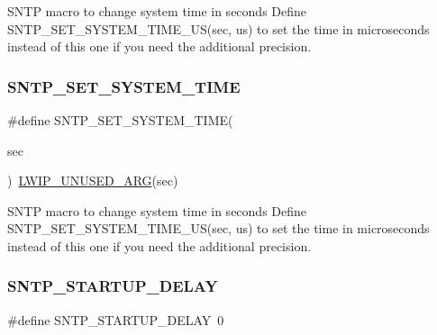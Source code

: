 S\+N\+TP macro to change system time in seconds Define S\+N\+T\+P\+\_\+\+S\+E\+T\+\_\+\+S\+Y\+S\+T\+E\+M\+\_\+\+T\+I\+M\+E\+\_\+\+U\+S(sec, us) to set the time in microseconds instead of this one if you need the additional precision. \mbox{\label{group__sntp__opts_gafe340b98c52dedcbc041267fe13b2da6}} 
\subsubsection{\texorpdfstring{S\+N\+T\+P\+\_\+\+S\+E\+T\+\_\+\+S\+Y\+S\+T\+E\+M\+\_\+\+T\+I\+ME}{SNTP\_SET\_SYSTEM\_TIME}\hspace{0.1cm}{\footnotesize\ttfamily [2/2]}}
{\footnotesize\ttfamily \#define S\+N\+T\+P\+\_\+\+S\+E\+T\+\_\+\+S\+Y\+S\+T\+E\+M\+\_\+\+T\+I\+ME(\begin{DoxyParamCaption}\item[{}]{sec }\end{DoxyParamCaption})~\hyperlink{group__compiler__abstraction_ga70624a5deb8b9199406372a7f3603ecf}{L\+W\+I\+P\+\_\+\+U\+N\+U\+S\+E\+D\+\_\+\+A\+RG}(sec)}

S\+N\+TP macro to change system time in seconds Define S\+N\+T\+P\+\_\+\+S\+E\+T\+\_\+\+S\+Y\+S\+T\+E\+M\+\_\+\+T\+I\+M\+E\+\_\+\+U\+S(sec, us) to set the time in microseconds instead of this one if you need the additional precision. \mbox{\label{group__sntp__opts_ga22017d43da7d4bf8d42e786b4ced4dfa}} 
\subsubsection{\texorpdfstring{S\+N\+T\+P\+\_\+\+S\+T\+A\+R\+T\+U\+P\+\_\+\+D\+E\+L\+AY}{SNTP\_STARTUP\_DELAY}\hspace{0.1cm}{\footnotesize\ttfamily [1/2]}}
{\footnotesize\ttfamily \#define S\+N\+T\+P\+\_\+\+S\+T\+A\+R\+T\+U\+P\+\_\+\+D\+E\+L\+AY~0}

